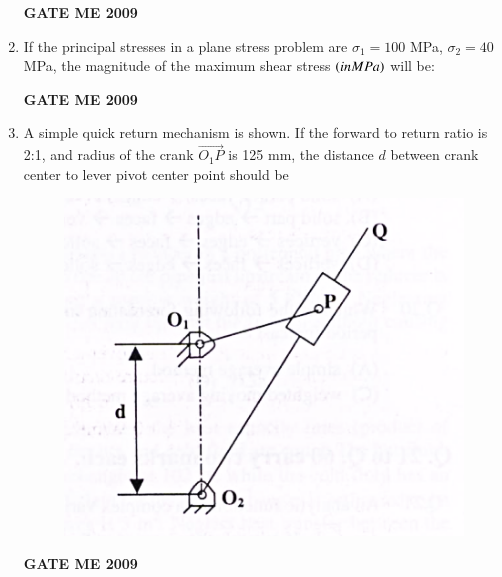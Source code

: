\documentclass[journal]{IEEEtran}
\begin{document}
\begin{enumerate}[leftmargin=0pt]
  \begin{enumerate}
  \end{enumerate}
  \hfill{\textbf{GATE ME 2009}}

\item If the principal stresses in a plane stress problem are $\sigma_1 = 100$ MPa, $\sigma_2 = 40$ MPa, the magnitude of the maximum shear stress $\left(in MPa\right)$ will be:
  \begin{enumerate}
  \end{enumerate}
  \hfill{\textbf{GATE ME 2009}}

\item A simple quick return mechanism is shown. If the forward to return ratio is 2:1, and radius of the crank $\overrightarrow{O_1P}$ is 125 mm, the distance $d$  between crank center to lever pivot center point should be
    \begin{figure}[h]
      \centering
      \includegraphics[width=0.3\linewidth]{Figs/image (3).png}
      \caption{}
    \end{figure}
    
  \begin{enumerate}
  \end{enumerate}
  \hfill{\textbf{GATE ME 2009}}



\end{enumerate}
\end{document}
